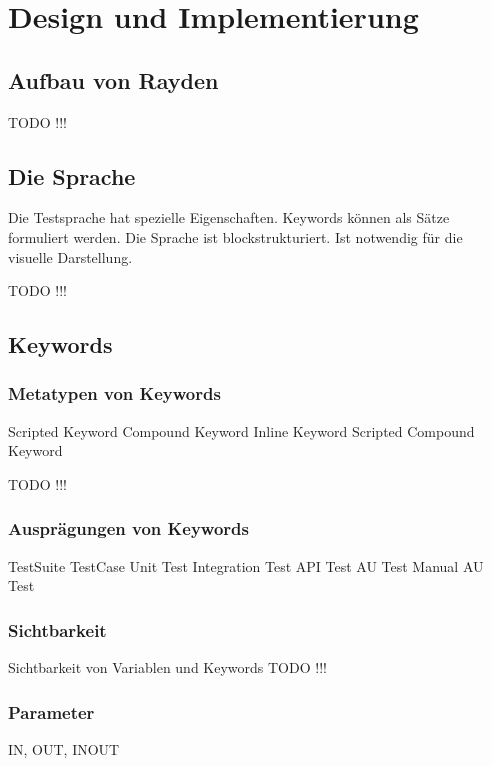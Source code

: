 ﻿\chapter{Design und Implementierung}
\label{cha:DesignUndImplementierung}

\section{Aufbau von Rayden}

TODO !!!

\section{Die Sprache}

Die Testsprache hat spezielle Eigenschaften. 
Keywords können als Sätze formuliert werden.
Die Sprache ist blockstrukturiert. Ist notwendig für die visuelle Darstellung.


TODO !!!

\section{Keywords}


\subsection{Metatypen von Keywords}

Scripted Keyword
Compound Keyword
Inline Keyword 
Scripted Compound Keyword

TODO !!!

\subsection{Ausprägungen von Keywords}

TestSuite
TestCase
Unit Test
Integration Test
API Test
AU Test
Manual AU Test

\subsection{Sichtbarkeit}

Sichtbarkeit von Variablen und Keywords
TODO !!!

\subsection{Parameter}

IN, OUT, INOUT


